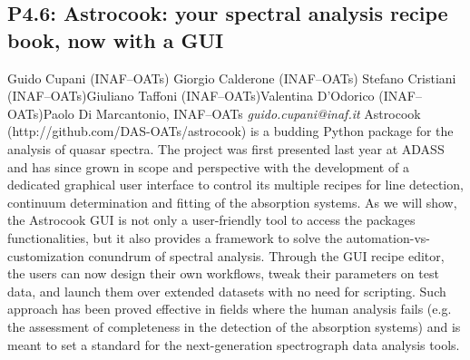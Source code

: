 \documentclass{report}
\begin{document}
\subsection*{P4.6: Astrocook: your spectral analysis recipe book, now with a GUI}
\bigskip
Guido Cupani (INAF–OATs) \newline Giorgio Calderone (INAF–OATs) \newline  Stefano Cristiani (INAF–OATs)\newline  Giuliano Taffoni (INAF–OATs)\newline Valentina D'Odorico (INAF–OATs)\newline  Paolo Di Marcantonio, INAF–OATs\newline\newline
{\it guido.cupani@inaf.it}\newline
\newline\newline
Astrocook (http://github.com/DAS-OATs/astrocook) is a budding Python package for the analysis of quasar spectra. The project was first presented last year at ADASS and has since grown in scope and perspective with the development of a dedicated graphical user interface to control its multiple recipes for line detection, continuum determination and fitting of the absorption systems. As we will show, the Astrocook GUI is not only a user-friendly tool to access the packages functionalities, but it also provides a framework to solve the automation-vs-customization conundrum of spectral analysis. Through the GUI recipe editor, the users can now design their own workflows, tweak their parameters on test data, and launch them over extended datasets with no need for scripting. Such approach has been proved effective in fields where the human analysis fails (e.g. the assessment of completeness in the detection of the absorption systems) and is meant to set a standard for the next-generation spectrograph data analysis tools.\newline
\newpage
\end{document}

